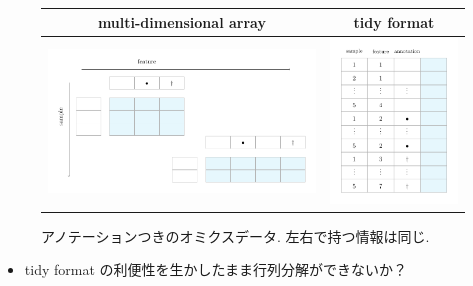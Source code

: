 \documentclass[dvipdfmx, dvipsnames]{beamer}
\begin{document}
\begin{frame}[noframenumbering]

\begin{figure}
\begin{tabular}{c|c}
\footnotesize multi-dimensional array & \footnotesize tidy format\footnotemark[1]\\
\hline
\includegraphics[height=0.4\textheight]{img/anndata} & 
\includegraphics[height=0.4\textheight]{img/ann_tidy}
\end{tabular}
\caption{アノテーションつきのオミクスデータ. 左右で持つ情報は同じ.}
\end{figure}

\begin{itemize}
\item tidy format の利便性を生かしたまま行列分解ができないか？
\end{itemize}

\end{frame}
\end{document}

